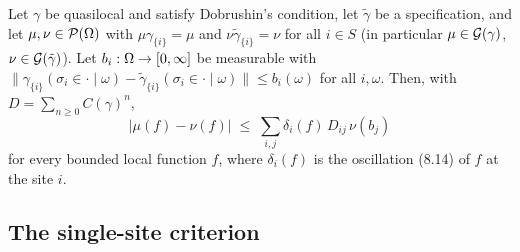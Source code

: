 \begin{theorem}
    \label{thm:dob-comparison}
    \leanok

    Let $\gamma$ be quasilocal and satisfy Dobrushin's condition, let $\tilde\gamma$ be a
    specification, and let $\mu, \nu \in \mathcal{P}(\Omega)$ with $\mu\gamma_{\{i\}} = \mu$ and
    $\nu\tilde\gamma_{\{i\}} = \nu$ for all $i \in S$ (in particular $\mu \in \mathcal{G}(\gamma)$,
    $\nu \in \mathcal{G}(\tilde\gamma)$). Let $b_i : \Omega \to [0,\infty]$ be measurable with
    $\lVert\gamma_{\{i\}}(\sigma_i \in \cdot \mid \omega)
      - \tilde\gamma_{\{i\}}(\sigma_i \in \cdot \mid \omega)\rVert \leq b_i(\omega)$ for all
    $i, \omega$. Then, with $D = \sum_{n \geq 0} C(\gamma)^n$,
    \[|\mu(f) - \nu(f)| \;\leq\; \sum_{i,j} \delta_i(f)\, D_{ij}\, \nu(b_j)\]
    for every bounded local function $f$, where $\delta_i(f)$ is the oscillation (8.14) of $f$ at
    the site $i$.
\end{theorem}

\subsection*{The single-site criterion}

